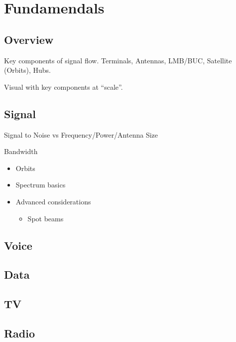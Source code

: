 \section{Fundamendals}
\label{fundamendals}

\subsection{Overview}
\label{overview}

Key components of signal flow. Terminals, Antennas, LMB\slash BUC, Satellite (Orbits), Hubs. 

Visual with key components at ``scale''.

\subsection{Signal}
\label{signal}

Signal to Noise vs Frequency\slash Power\slash Antenna Size

Bandwidth

\begin{itemize}
\item Orbits

\item Spectrum basics

\item Advanced considerations

\begin{itemize}
\item Spot beams

\end{itemize}

\end{itemize}

\subsection{Voice}
\label{voice}

\subsection{Data}
\label{data}

\subsection{TV}
\label{tv}

\subsection{Radio}
\label{radio}

